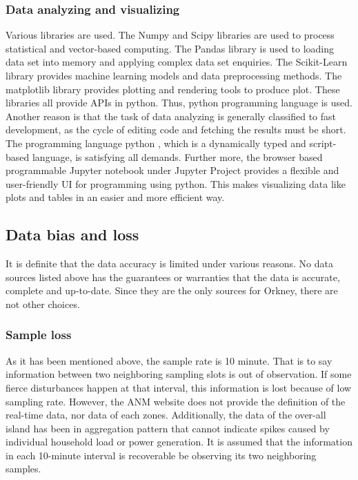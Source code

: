 \documentclass[12pt,a4paper]{report}
\begin{document}
                \subsubsection{Data analyzing and visualizing}
                Various libraries are used. The Numpy and Scipy libraries \cite{website:numpy} \cite{website:scipy} are used to process statistical and vector-based computing. The Pandas library \cite{website:pandas} is used
                to loading data set into memory and applying complex data set enquiries. The Scikit-Learn library \cite{website:scikit} provides machine learning models and data preprocessing methods. The matplotlib library
                \cite{website:matplotlib} provides plotting and rendering tools to produce plot. These libraries all provide APIs in python. Thus, python programming language \cite{website:python3} is used. Another reason is that
                the task of data analyzing is generally classified to fast development, as the cycle of editing code and fetching the results must be short. The programming language python \cite{website:python3}, which is a
                dynamically typed and script-based language, is satisfying all demands. Further more, the browser based programmable Jupyter notebook under Jupyter Project \cite{website:jupyter} provides a flexible and user-friendly
                UI for programming using python. This makes visualizing data like plots and tables in an easier and more efficient way.
                
        \subsection{Data bias and loss}
        It is definite that the data accuracy is limited under various reasons. No data sources listed above has the guarantees or warranties that the data is accurate, complete and up-to-date. 
        Since they are the only sources for Orkney, there are not other choices.

                \subsubsection{Sample loss}
                As it has been mentioned above, the sample rate is 10 minute. That is to say information between two neighboring sampling slots is out of observation.
                If some fierce disturbances happen at that interval, this information is lost because of low sampling rate. However, the ANM website does not provide
                the definition of the real-time data, nor data of each zones. Additionally, the data of the over-all island has been in aggregation pattern that cannot
                indicate spikes caused by individual household load or power generation. It is assumed that the information in each 10-minute interval is recoverable be
                observing its two neighboring samples.
\end{document}
